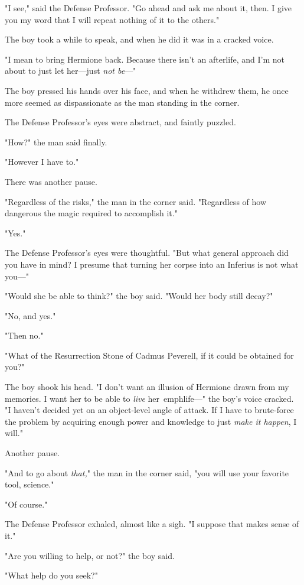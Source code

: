 "I see," said the Defense Professor. "Go ahead and ask me about it, then. I 
give you my word that I will repeat nothing of it to the others."

The boy took a while to speak, and when he did it was in a cracked voice.

"I mean to bring Hermione back. Because there isn't an afterlife, and I'm not 
about to just let her---just \emph{not be}---"

The boy pressed his hands over his face, and when he withdrew them, he once 
more seemed as dispassionate as the man standing in the corner.

The Defense Professor's eyes were abstract, and faintly puzzled.

"How?" the man said finally.

"However I have to."

There was another pause.

"Regardless of the risks," the man in the corner said. "Regardless of how 
dangerous the magic required to accomplish it."

"Yes."

The Defense Professor's eyes were thoughtful. "But what general approach did 
you have in mind? I presume that turning her corpse into an Inferius is not 
what you---"

"Would she be able to think?" the boy said. "Would her body still decay?"

"No, and yes."

"Then no."

"What of the Resurrection Stone of Cadmus Peverell, if it could be obtained for 
you?"

The boy shook his head. "I don't want an illusion of Hermione drawn from my 
memories. I want her to be able to \emph{live} her\ emph{life---}" the boy's 
voice cracked. "I haven't decided yet on an object-level angle of attack. If I 
have to brute-force the problem by acquiring enough power and knowledge to just 
\emph{make it happen}, I will."

Another pause.

"And to go about \emph{that,}" the man in the corner said, "you will use your 
favorite tool, science."

"Of course."

The Defense Professor exhaled, almost like a sigh. "I suppose that makes sense 
of it."

"Are you willing to help, or not?" the boy said.

"What help do you seek?"

